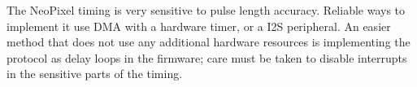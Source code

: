 The NeoPixel timing is very sensitive to pulse length accuracy. Reliable ways to implement it use DMA with a hardware timer, or a I2S peripheral. An easier method that does not use any additional hardware resources is implementing the protocol as delay loops in the firmware; care must be taken to disable interrupts in the sensitive parts of the timing.












